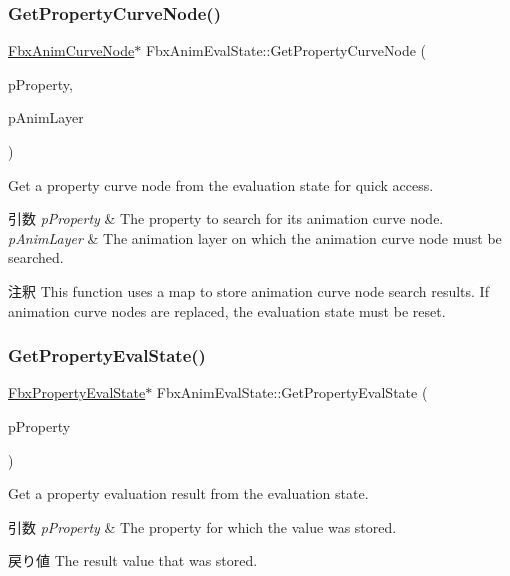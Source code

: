 \subsubsection{\texorpdfstring{Get\+Property\+Curve\+Node()}{GetPropertyCurveNode()}}
{\footnotesize\ttfamily \hyperlink{class_fbx_anim_curve_node}{Fbx\+Anim\+Curve\+Node}$\ast$ Fbx\+Anim\+Eval\+State\+::\+Get\+Property\+Curve\+Node (\begin{DoxyParamCaption}\item[{\hyperlink{class_fbx_property}{Fbx\+Property} \&}]{p\+Property,  }\item[{\hyperlink{class_fbx_anim_layer}{Fbx\+Anim\+Layer} $\ast$}]{p\+Anim\+Layer }\end{DoxyParamCaption})}

Get a property curve node from the evaluation state for quick access. 
\begin{DoxyParams}{引数}
{\em p\+Property} & The property to search for its animation curve node. \\
\hline
{\em p\+Anim\+Layer} & The animation layer on which the animation curve node must be searched. \\
\hline
\end{DoxyParams}
\begin{DoxyRemark}{注釈}
This function uses a map to store animation curve node search results. If animation curve nodes are replaced, the evaluation state must be reset. 
\end{DoxyRemark}
\mbox{\label{class_fbx_anim_eval_state_a43703fd0f0799332d5840a6f4b549081}} 
\subsubsection{\texorpdfstring{Get\+Property\+Eval\+State()}{GetPropertyEvalState()}}
{\footnotesize\ttfamily \hyperlink{class_fbx_property_eval_state}{Fbx\+Property\+Eval\+State}$\ast$ Fbx\+Anim\+Eval\+State\+::\+Get\+Property\+Eval\+State (\begin{DoxyParamCaption}\item[{\hyperlink{class_fbx_property}{Fbx\+Property} \&}]{p\+Property }\end{DoxyParamCaption})}

Get a property evaluation result from the evaluation state. 
\begin{DoxyParams}{引数}
{\em p\+Property} & The property for which the value was stored. \\
\hline
\end{DoxyParams}
\begin{DoxyReturn}{戻り値}
The result value that was stored. 
\end{DoxyReturn}
\mbox{\label{class_fbx_anim_eval_state_ad6674f0c37ecd45c15dcfbc220f8faff}} 
